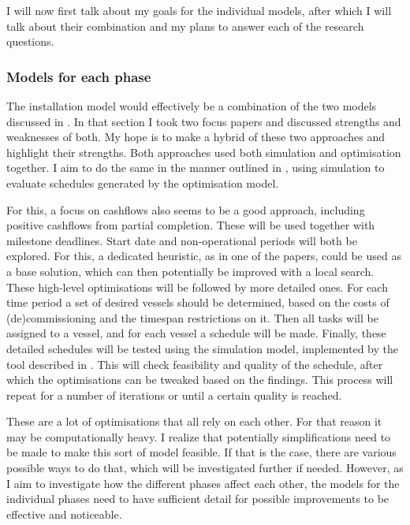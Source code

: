 \documentclass[a4paper,12pt]{article}
\begin{document}
I will now first talk about my goals for the individual models, after which I will talk about their combination and my plans to answer each of the research questions. 

\subsubsection{Models for each phase} \label{sss:phases}
The installation model would effectively be a combination of the two models discussed in . In that section I took two focus papers \cite{barlow2018mixed,kerkhove2017optimised} and discussed strengths and weaknesses of both. My hope is to make a hybrid of these two approaches and highlight their strengths. Both approaches used both simulation and optimisation together. I aim to do the same in the manner outlined in , using simulation to evaluate schedules generated by the optimisation model. 

For this, a focus on cashflows also seems to be a good approach, including positive cashflows from partial completion. These will be used together with milestone deadlines. Start date and non-operational periods will both be explored. For this, a dedicated heuristic, as in one of the papers, could be used as a base solution, which can then potentially be improved with a local search. These high-level optimisations will be followed by more detailed ones. For each time period a set of desired vessels should be determined, based on the costs of (de)commissioning and the timespan restrictions on it. Then all tasks will be assigned to a vessel, and for each vessel a schedule will be made. Finally, these detailed schedules will be tested using the simulation model, implemented by the tool described in . This will check feasibility and quality of the schedule, after which the optimisations can be tweaked based on the findings. This process will repeat for a number of iterations or until a certain quality is reached. 

These are a lot of optimisations that all rely on each other. For that reason it may be computationally heavy. I realize that potentially simplifications need to be made to make this sort of model feasible. If that is the case, there are various possible ways to do that, which will be investigated further if needed. However, as I aim to investigate how the different phases affect each other, the models for the individual phases need to have sufficient detail for possible improvements to be effective and noticeable. 
\end{document}
